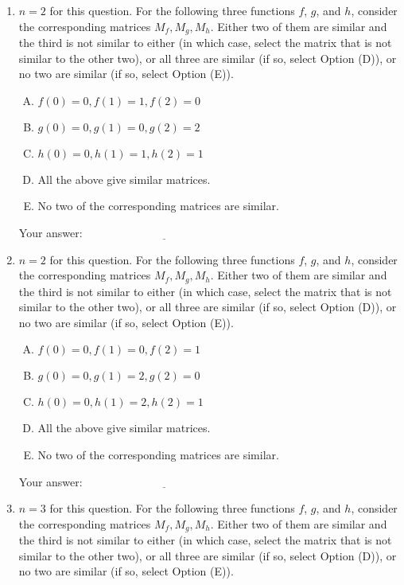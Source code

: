 \documentclass[10pt]{amsart}
\begin{document}
\begin{enumerate}
\item $n = 2$ for this question. For the following three functions
  $f$, $g$, and $h$, consider the corresponding matrices
  $M_f,M_g,M_h$. Either two of them are similar and the third is not
  similar to either (in which case, select the matrix that is not
  similar to the other two), or all three are similar (if so, select
  Option (D)), or no two are similar (if so, select Option (E)).

  \begin{enumerate}[(A)]
  \item $f(0) = 0, f(1) = 1, f(2) = 0$
  \item $g(0) = 0, g(1) = 0, g(2) = 2$
  \item $h(0) = 0, h(1) = 1, h(2) = 1$
  \item All the above give similar matrices.
  \item No two of the corresponding matrices are similar.
  \end{enumerate}

  \vspace{0.1in}
  Your answer: $\underline{\qquad\qquad\qquad\qquad\qquad\qquad\qquad}$
  \vspace{0.1in}

\item $n = 2$ for this question. For the following three functions
  $f$, $g$, and $h$, consider the corresponding matrices
  $M_f,M_g,M_h$. Either two of them are similar and the third is not
  similar to either (in which case, select the matrix that is not
  similar to the other two), or all three are similar (if so, select
  Option (D)), or no two are similar (if so, select Option (E)).

  \begin{enumerate}[(A)]
  \item $f(0) = 0, f(1) = 0, f(2) = 1$
  \item $g(0) = 0, g(1) = 2, g(2) = 0$
  \item $h(0) = 0, h(1) = 2, h(2) = 1$
  \item All the above give similar matrices.
  \item No two of the corresponding matrices are similar.
  \end{enumerate}

  \vspace{0.1in}
  Your answer: $\underline{\qquad\qquad\qquad\qquad\qquad\qquad\qquad}$
  \vspace{0.1in}

\item $n = 3$ for this question. For the following three functions
  $f$, $g$, and $h$, consider the corresponding matrices
  $M_f,M_g,M_h$. Either two of them are similar and the third is not
  similar to either (in which case, select the matrix that is not
  similar to the other two), or all three are similar (if so, select
  Option (D)), or no two are similar (if so, select Option (E)).


\end{enumerate}
\end{document}
